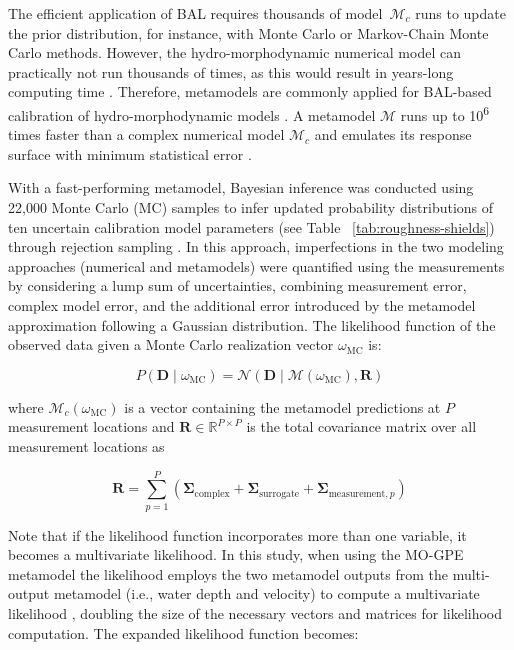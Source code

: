 \documentclass[draft,linenumbers,onecolumn]{agujournal2019} %
\begin{document}
The efficient application of BAL requires thousands of model~$\mathcal{M}_c$ runs to update the prior distribution, for instance, with Monte Carlo or Markov-Chain Monte Carlo methods. However, the hydro-morphodynamic numerical model can practically not run thousands of times, as this would result in years-long computing time \cite{oladyshkin2020bayesian3}. Therefore, metamodels are commonly applied for BAL-based calibration of hydro-morphodynamic models \cite{beckers2020bayesian, mouris2023stability, schwindt2023bayesian}.  A metamodel  $\mathcal{M}$ runs up to 10\textsuperscript{6} times faster than a complex numerical model  $\mathcal{M}_c$ and emulates its response surface with minimum statistical error \cite{beckers2020bayesian}.

With a fast-performing metamodel, Bayesian inference was conducted using 22,000 Monte Carlo (MC) samples to infer updated probability distributions of ten uncertain calibration model parameters (see Table ~\ref{tab:roughness-shields}) through rejection sampling \cite{smith1992bayesian}. In this approach, imperfections in the two modeling approaches (numerical and metamodels) were quantified using the measurements by considering a lump sum of uncertainties, combining measurement error, complex model error, and the additional error introduced by the metamodel approximation following a Gaussian distribution. The likelihood function of the observed data given a Monte Carlo realization vector $\omega_{\text{MC}}$ is:

\begin{equation} \label{eq:mc}
	P(\mathbf{D} \mid \omega_{\text{MC}}) = \mathcal{N}(\mathbf{D} \mid \mathcal{M}(\omega_{\text{MC}}), \bm{R})
\end{equation}

where $\mathcal{M}_c(\omega_{\text{MC}})$ is a vector containing the metamodel predictions at $P$ measurement locations and $\bm{R} \in \mathbb{R}^{P \times P}$ is the total covariance matrix over all measurement locations as

\begin{equation} \label{eq:covar}
	\mathbf{R} = \sum_{p=1}^{P} \left( \mathbf{\Sigma}_{\text{complex}} + \mathbf{\Sigma}_{\text{surrogate}} + \mathbf{\Sigma}_{\text{measurement},p} \right)
\end{equation}

Note that if the likelihood function incorporates more than one variable, it becomes a multivariate likelihood. In this study, when using the MO-GPE metamodel the likelihood employs the two metamodel outputs from the multi-output metamodel (i.e., water depth and velocity) to compute a multivariate likelihood , doubling the size of the necessary vectors and matrices for likelihood computation. The expanded likelihood function becomes: 
\end{document}
